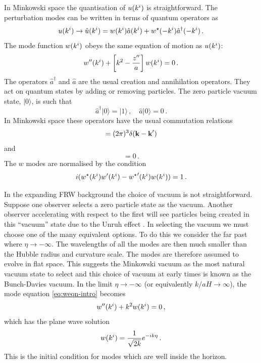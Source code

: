 In Minkowski space the quantisation of $u(k^i)$ is straightforward.
The perturbation modes can be written in terms of quantum operators as
% 
\begin{equation}
 u(k^i)\rightarrow\hat{u}(k^i) = 
  w(k^i) \hat{a}(k^i) + w^\star(-k^i)\hat{a}^\dagger(-k^i) \,.
\end{equation}
%
The mode function $w(k^i)$ obeys the same equation of motion as $u(k^i)$:
% 
\begin{equation}
\label{eq:weqn-intro}
 w''(k^i) + \left[ k^2 -\frac{z''}{a}\right]w(k^i) = 0\,.
\end{equation}
% 
The operators $\hat{a}^\dagger$ and $\hat{a}$ are the usual creation and
annihilation operators. They act on quantum states by adding or
removing particles. The zero particle vacuum state, $|0\rangle$, is such that
% 
\begin{equation}
 \hat{a}^\dagger|0\rangle = |1\rangle\,,\quad \hat{a}|0\rangle = 0\,.
\end{equation}
% 
In Minkowski space these operators have the usual commutation relations
% 
\begin{equation}
 [\hat{a}(\kb), \hat{a}^\dagger(\kb')] = (2\pi)^3 \delta(\kb -\kb') \\
\end{equation}
and
\begin{equation}
[\hat{a}(\kb), \hat{a}(\kb')] = 0\,.
\end{equation}
% 
The $w$ modes are normalised by the condition \cite{Mukhanov:2005sc}
% 
\begin{equation}
\label{eq:quantcondition-intro}
 i(w^\star(k^i)w'(k^i) - {w^{\star}}'(k^i)w(k^i)) = 1\,.
\end{equation}


In the expanding FRW background the choice of vacuum is not straightforward.
Suppose one observer selects a zero particle state as the vacuum. Another
observer accelerating with respect to the first will see particles being
created in this ``vacuum'' state due to the Unruh effect
\cite{Kinney2009, Unruh1976a}. In selecting the vacuum we must choose one of the
many equivalent options.
To do this we consider the far past where $\eta\rightarrow -\infty$. The wavelengths of all the
modes are then much smaller than the Hubble radius and curvature scale. The modes are
therefore assumed to evolve in flat space. This suggests the Minkowski vacuum as the
most natural vacuum state to select and this choice of vacuum at
early times is known as the Bunch-Davies vacuum.
% 
In the limit $\eta\rightarrow -\infty$ (or equivalently $k/aH\rightarrow \infty$),
the mode equation
\eqref{eq:weqn-intro} becomes
% 
\begin{equation}
  w''(k^i) + k^2 w(k^i) = 0\,,
\end{equation}
% 
which has the plane wave solution
% 
\begin{equation}
\label{eq:subhsoln-intro}
 w(k^i) = \frac{1}{\sqrt{2k}} e^{-ik\eta}\,.
\end{equation}
% 
This is the initial condition for modes which are well inside the horizon.

